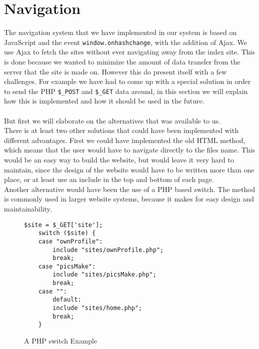 \section{Navigation}
The navigation system that we have implemented in our system is based on JavaScript and the event \texttt{window.onhashchange}, with the addition of Ajax.
We use Ajax to fetch the sites without ever navigating away from the index site. This is done because we wanted to minimize the amount of data transfer from the server that the site is made on. However this do present itself with a few challenges. For example we have had to come up with a special solution in order to send the PHP \texttt{\$\_POST} and \texttt{\$\_GET} data around, in this section we will explain how this is implemented and how it should be used in the future.\\
\\
But first we will elaborate on the alternatives that was available to us.\\
There is at least two other solutions that could have been implemented with different advantages. First we could have implemented the old HTML method, which means that the user would have to navigate directly to the files name. This would be an easy way to build the website, but would leave it very hard to maintain, since the design of the website would have to be written more than one place, or at least use an include in the top and bottom of each page.\\
Another alternative would have been the use of a PHP based switch. The method is commonly used in larger website systems, because it makes for easy design and maintainability.
\lstset{language=PHP}
\begin{figure}[htbp]
\begin{lstlisting}[firstline=1]
	$site = $_GET['site'];
	switch ($site) {
    case "ownProfile":
        include "sites/ownProfile.php";
        break;
    case "picsMake":
        include "sites/picsMake.php";
        break;
    case "":
		default:
        include "sites/home.php";
        break;
	}
\end{lstlisting}
\caption{A PHP switch Example}
\label{lst:phpSwitch}
\end{figure}

